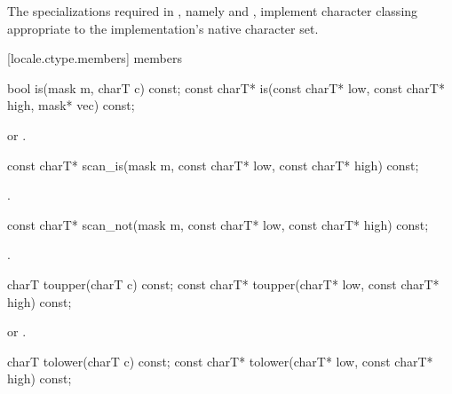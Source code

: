 \pnum
The specializations
required in ,
namely  and ,
implement character classing appropriate
to the implementation's native character set.

[locale.ctype.members]{ members}

%
\begin{itemdecl}
bool         is(mask m, charT c) const;
const charT* is(const charT* low, const charT* high, mask* vec) const;
\end{itemdecl}

\begin{itemdescr}
\pnum
\returns
{} or .
\end{itemdescr}

%
\begin{itemdecl}
const charT* scan_is(mask m, const charT* low, const charT* high) const;
\end{itemdecl}

\begin{itemdescr}
\pnum
\returns
{}.
\end{itemdescr}

%
\begin{itemdecl}
const charT* scan_not(mask m, const charT* low, const charT* high) const;
\end{itemdecl}

\begin{itemdescr}
\pnum
\returns
{}.
\end{itemdescr}

%
\begin{itemdecl}
charT        toupper(charT c) const;
const charT* toupper(charT* low, const charT* high) const;
\end{itemdecl}

\begin{itemdescr}
\pnum
\returns
{} or .
\end{itemdescr}

%
\begin{itemdecl}
charT        tolower(charT c) const;
const charT* tolower(charT* low, const charT* high) const;
\end{itemdecl}

